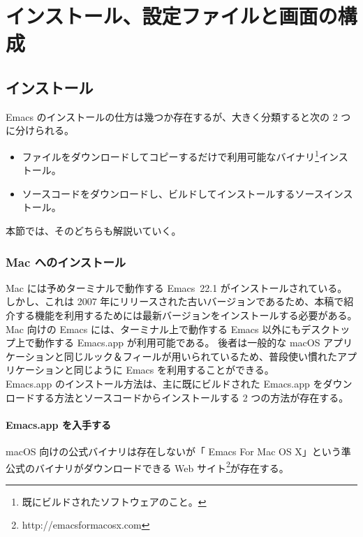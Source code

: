 \chapter{インストール、設定ファイルと画面の構成}
\section{インストール}
Emacs のインストールの仕方は幾つか存在するが、大きく分類すると次の 2 つに分けられる。
\begin{itemize}\setlength{\leftskip}{-1.00zw}%
\item ファイルをダウンロードしてコピーするだけで利用可能なバイナリ\footnote{既にビルドされたソフトウェアのこと。}インストール。
\item ソースコードをダウンロードし、ビルドしてインストールするソースインストール。
\end{itemize}
本節では、そのどちらも解説いていく。
\subsection{Mac へのインストール}
Mac には予めターミナルで動作する Emacs~22.1 がインストールされている。
しかし、これは 2007 年にリリースされた古いバージョンであるため、本稿で紹介する機能を利用するためには最新バージョンをインストールする必要がある。\\

Mac 向けの Emacs には、ターミナル上で動作する Emacs 以外にもデスクトップ上で動作する Emacs.app が利用可能である。
後者は一般的な macOS アプリケーションと同じルック＆フィールが用いられているため、普段使い慣れたアプリケーションと同じように Emacs を利用することができる。\\

Emacs.app のインストール方法は、主に既にビルドされた Emacs.app をダウンロードする方法とソースコードからインストールする 2 つの方法が存在する。
\subsubsection{Emacs.app を入手する}
macOS 向けの公式バイナリは存在しないが「 Emacs For Mac OS X」という準公式のバイナリがダウンロードできる Web サイト\footnote{http://emacsformacosx.com}が存在する。\\

